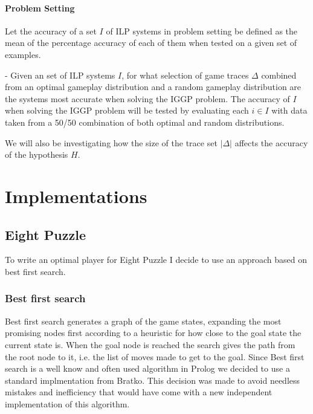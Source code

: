 \documentclass[a4paper,12pt]{report}
\begin{document}
\subsubsection{Problem Setting}
Let the accuracy of a set $I$ of ILP systems in problem setting be defined as the mean of the percentage accuracy of each of them when tested on a given set of examples.

- Given an set of ILP systems $I$, for what selection of game traces $\Delta$ combined from an optimal gameplay distribution and a random gameplay distribution are the systems most accurate when solving the IGGP problem. The accuracy of $I$ when solving the IGGP problem will be tested by evaluating each $i \in I$ with data taken from a 50/50 combination of both optimal and random distributions.

We will also be investigating how the size of the trace set $|\Delta|$ affects the accuracy of the hypothesis $H$.
    
\chapter{Implementations}
\section{Eight Puzzle}
To write an optimal player for Eight Puzzle I decide to use an approach based on best first search. 
\subsection{Best first search}
Best first search generates a graph of the game states, expanding the most promising nodes first according to a heuristic for how close to the goal state the current state is. When the goal node is reached the search gives the path from the root node to it, i.e. the list of moves made to get to the goal.
Since Best first search is a well know and often used algorithm in Prolog we decided to use a standard implmentation from Bratko\cite{Bratko}. This decision was made to avoid needless mistakes and inefficiency that would have come with a new independent implementation of this algorithm.
\end{document}
